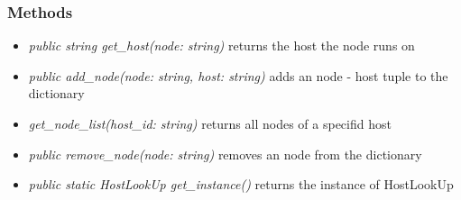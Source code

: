 \subsubsection{Methods}
\begin{itemize}
	\item \textit{ public string get\_host(node: string) }
		returns the host the node runs on
	\item \textit{ public add\_node(node: string, host: string) }
		adds an node - host tuple to the dictionary
	\item \textit{ get\_node\_list(host\_id: string) }
		returns all nodes of a specifid host
	\item \textit{ public remove\_node(node: string) }
		removes an node from the dictionary
	\item \textit{ public static HostLookUp get\_instance() }
		returns the instance of HostLookUp
\end{itemize}